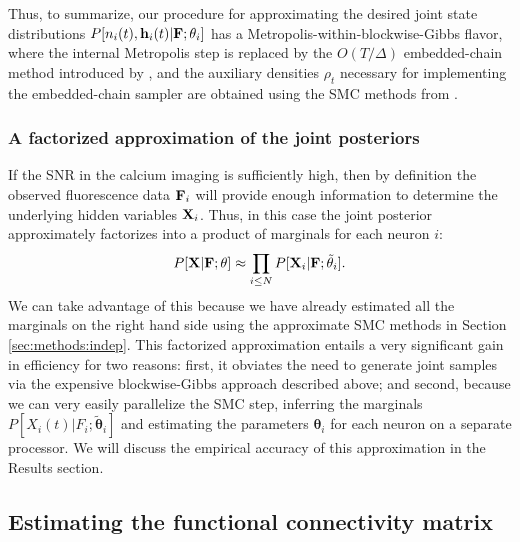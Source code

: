 \documentclass[aoas,preprint]{imsart}
\newcommand{\bth}{\mathbf{\theta}}
\newcommand{\bF}{{\bf F}}
\newcommand{\bX}{{\bf X}}
\newcommand{\bh}{\mathbf{h}}
\newcommand{\tbth}{\tilde{\bth}}
\begin{document}
Thus, to summarize, our procedure for approximating the desired joint
state distributions $P[n_i(t), \bh_i(t) | \bF;\bth_i]$ has a
Metropolis-within-blockwise-Gibbs flavor, where the internal
Metropolis step is replaced by the $O(T/\Delta)$ embedded-chain method
introduced by \cite{NBR03}, and the auxiliary densities $\rho_t$
necessary for implementing the embedded-chain sampler are obtained
using the SMC methods from \cite{Vogelstein2009}.

\subsubsection{A factorized approximation of the joint posteriors}
\label{sec:cheaper-high-snr}

If the SNR in the calcium imaging is sufficiently high, then by
definition the observed fluorescence data $\bF_i$ will provide enough
information to determine the underlying hidden variables
$\bX_i$. Thus, in this case the joint posterior approximately
factorizes into a product of marginals for each neuron $i$:
\begin{equation} \label{eqn:indep_approx}
  P[\bX|\bF;\bth] \approx \prod_{i\leq N} P[\bX_i | \bF; \tbth_i].
\end{equation}
We can take advantage of this because we have already estimated all
the marginals on the right hand side using the approximate SMC methods
in Section \ref{sec:methods:indep}.  This factorized approximation
entails a very significant gain in efficiency for two reasons: first,
it obviates the need to generate joint samples via the expensive
blockwise-Gibbs approach described above; and second, because we can
very easily parallelize the SMC step, inferring the marginals
$P[X_i(t) | F_i; \tbth_i]$ and estimating the parameters $\bth_i$ for
each neuron on a separate processor. We will discuss the empirical
accuracy of this approximation in the Results section.

\subsection{Estimating the functional connectivity matrix} \label{sec:methods:parameters HMM}
\end{document}
